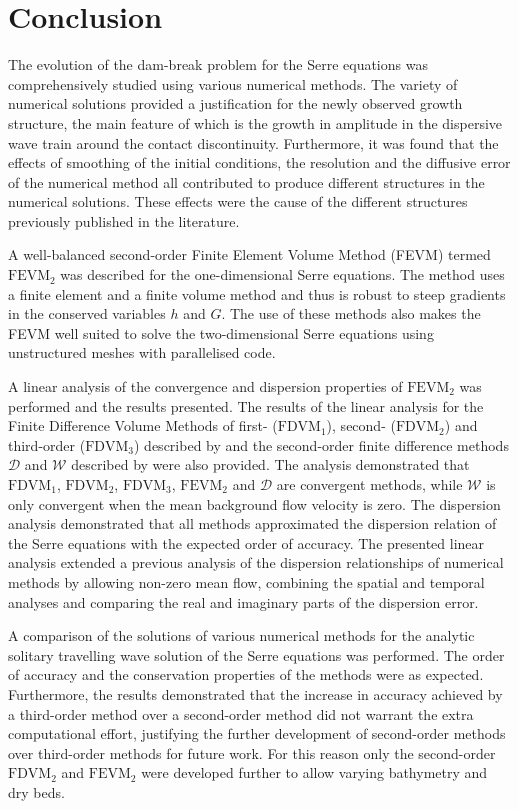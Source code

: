 
\chapter{Conclusion}
\label{chp:Conclusion}
The evolution of the dam-break problem for the Serre equations was comprehensively studied using various numerical methods. The variety of numerical solutions provided a justification for the newly observed growth structure, the main feature of which is the growth in amplitude in the dispersive wave train around the contact discontinuity. Furthermore, it was found that the effects of smoothing of the initial conditions, the resolution and the diffusive error of the numerical method all contributed to produce different structures in the numerical solutions. These effects were the cause of the different structures previously published in the literature. 

A well-balanced second-order Finite Element Volume Method (FEVM) termed $\text{FEVM}_2$ was described for the one-dimensional Serre equations. The method uses a finite element and a finite volume method and thus is robust to steep gradients in the conserved variables $h$ and $G$. The use of these methods also makes the FEVM well suited to solve the two-dimensional Serre equations using unstructured meshes with parallelised code. 

A linear analysis of the convergence and dispersion properties of $\text{FEVM}_2$ was performed and the results presented. The results of the linear analysis for the Finite Difference Volume Methods of first- ($\text{FDVM}_1$), second- ($\text{FDVM}_2$) and third-order ($\text{FDVM}_3$) described by \citet{Zoppou-etal-2017} and the second-order finite difference methods $\mathcal{D}$ and $\mathcal{W}$ described by \citet{Pitt-2018-61} were also provided. The analysis demonstrated that $\text{FDVM}_1$, $\text{FDVM}_2$, $\text{FDVM}_3$, $\text{FEVM}_2$ and $\mathcal{D}$ are convergent methods, while $\mathcal{W}$ is only convergent when the mean background flow velocity is zero. The dispersion analysis demonstrated that all methods approximated the dispersion relation of the Serre equations with the expected order of accuracy. The presented linear analysis extended a previous analysis of the dispersion relationships of numerical methods \cite{Filippini-etal-2016-381} by allowing non-zero mean flow, combining the spatial and temporal analyses and comparing the real and imaginary parts of the dispersion error. 

A comparison of the solutions of various numerical methods for the analytic solitary travelling wave solution of the Serre equations was performed. The order of accuracy and the conservation properties of the methods were as expected. Furthermore, the results demonstrated that the increase in accuracy achieved by a third-order method over a second-order method did not warrant the extra computational effort, justifying the further development of second-order methods over third-order methods for future work. For this reason only the second-order $\text{FDVM}_2$ and $\text{FEVM}_2$ were developed further to allow varying bathymetry and dry beds.

